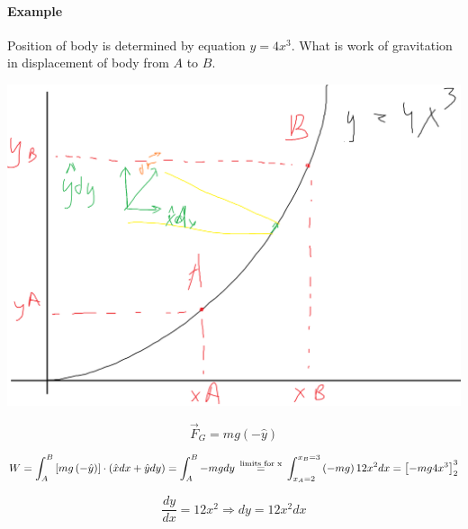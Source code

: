 \paragraph{Example} Position of body is determined by equation $y=4x^3$. What is work of gravitation in displacement of body from $A$ to $B$.


\begin{center}
	\includegraphics[width=\linewidth]{./lect9/pic2.png}
\end{center}


$$\vec{F}_G = mg(-\hat{y})$$

$$W = \int_{A}^{B} \left[ mg\left( - \hat{y} \right) \right] \cdot \left( \hat{x}dx + \hat{y}dy \right) = \int_{A}^{B} -mg dy \stackrel{\parbox{1.5cm}{\centering \scriptsize limits for x}}{=} \int_{x_A=2}^{x_B=3} \left( -mg \right) 12 x^2 dx = \left[ -mg4x^3 \right]^3_2$$

$$\frac{dy}{dx} = 12x^2 \Rightarrow dy = 12x^2 dx$$